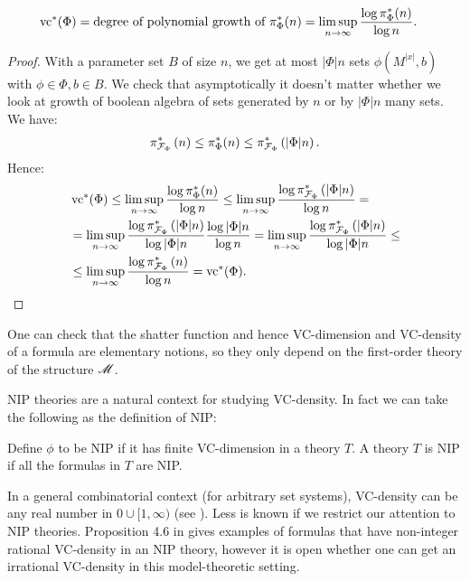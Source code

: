 \begin{Lemma} \label{count_types}
  \begin{align*}
    \operatorname{vc}^*(\Phi) &= \text{degree of polynomial growth of $\pi^*_\Phi(n)$}  = \limsup_{n \to \infty}\frac{\log \pi^*_\Phi(n)}{\log n}.
  \end{align*}  
\end{Lemma}

\begin{proof}
  With a parameter set $B$ of size $n$, we get at most $|\Phi|n$ sets $\phi(M^{|x|}, b)$ with $\phi \in \Phi, b \in B$.
  We check that asymptotically it doesn't matter whether we look at growth of boolean algebra of sets generated by
  $n$ or by $|\Phi|n$ many sets.
  We have:
  \begin{align*}
    \pi^*_{\mathcal F_\Phi}\left(n\right) \leq \pi^*_\Phi(n) \leq \pi^*_{\mathcal F_\Phi}\left(|\Phi|n\right).
  \end{align*}
  Hence:
  \begin{align*}
    &\operatorname{vc}^*(\Phi) \leq \limsup_{n \to \infty}\frac{\log \pi^*_\Phi(n)}{\log n} \leq \limsup_{n \to \infty}\frac{\log \pi^*_{\mathcal F_\Phi}\left(|\Phi|n\right)}{\log n} = \\
    & = \limsup_{n \to \infty}\frac{\log \pi^*_{\mathcal F_\Phi}\left(|\Phi|n\right)}{\log |\Phi|n} \frac{\log |\Phi|n}{\log n} =
      \limsup_{n \to \infty}\frac{\log \pi^*_{\mathcal F_\Phi}\left(|\Phi|n\right)}{\log |\Phi|n} \leq \\
    &\leq \limsup_{n \to \infty}\frac{\log \pi^*_{\mathcal F_\Phi}\left(n\right)}{\log n} = \operatorname{vc}^*(\Phi).
  \end{align*}
\end{proof} 

One can check that the shatter function and hence VC-dimension and VC-density of a formula are elementary notions,
so they only depend on the first-order theory of the structure $\mathscr M$.

NIP theories are a natural context for studying VC-density.
In fact we can take the following as the definition of NIP:
\begin{Definition}
  Define $\phi$ to be NIP if it has finite VC-dimension in a theory $T$.
  A theory $T$ is NIP if all the formulas in $T$ are NIP.
\end{Definition}

In a general combinatorial context (for arbitrary set systems),
VC-density can be any real number in $0 \cup [1, \infty)$ (see \cite{ash8}).
Less is known if we restrict our attention to NIP theories.
Proposition 4.6 in \cite{density} gives examples of formulas that have non-integer rational VC-density in an NIP theory,
however it is open whether one can get an irrational VC-density in this model-theoretic setting.

